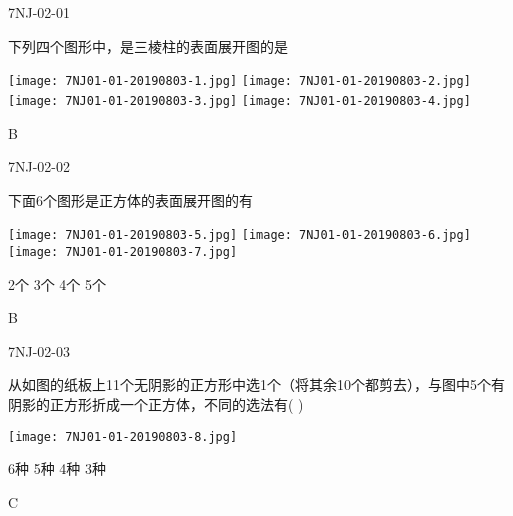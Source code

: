 
\begin{defproblem}{7NJ-02-01}%
\begin{onlyproblem}%
下列四个图形中，是三棱柱的表面展开图的是
\begin{center}
\texttt{[image: 7NJ01-01-20190803-1.jpg]}
\texttt{[image: 7NJ01-01-20190803-2.jpg]}
\texttt{[image: 7NJ01-01-20190803-3.jpg]}
\texttt{[image: 7NJ01-01-20190803-4.jpg]}
\end{center}
\end{onlyproblem}%
\begin{onlysolution}%
\begin{solution}%
B
\end{solution}%
\end{onlysolution}%
\end{defproblem}





\begin{defproblem}{7NJ-02-02}%
\begin{onlyproblem}%
下面6个图形是正方体的表面展开图的有
\begin{center}
\texttt{[image: 7NJ01-01-20190803-5.jpg]}
\texttt{[image: 7NJ01-01-20190803-6.jpg]}
\texttt{[image: 7NJ01-01-20190803-7.jpg]}
\end{center}
\xx
{2个}
{3个}
{4个}
{5个}
\end{onlyproblem}%
\begin{onlysolution}%
\begin{solution}%
B
\end{solution}%
\end{onlysolution}%
\end{defproblem}




\begin{defproblem}{7NJ-02-03}%
\begin{onlyproblem}%
从如图的纸板上11个无阴影的正方形中选1个（将其余10个都剪去），与图中5个有阴影的正方形折成一个正方体，不同的选法有(    ) 
\begin{center}
\texttt{[image: 7NJ01-01-20190803-8.jpg]}
\end{center}

\xx
{6种}
{5种}
{4种}
{3种}

\end{onlyproblem}%
\begin{onlysolution}%
\begin{solution}%
C
\end{solution}%
\end{onlysolution}%
\end{defproblem}




